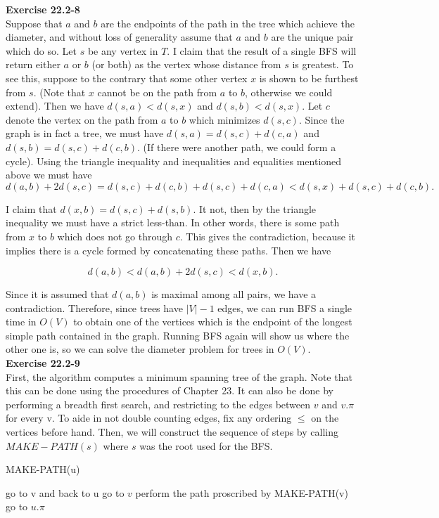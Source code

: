 \documentclass{article}
\begin{document}
\noindent\textbf{Exercise 22.2-8}\\

Suppose that $a$ and $b$ are the endpoints of the path in the tree which achieve the diameter, and without loss of generality assume that $a$ and $b$ are the unique pair which do so.  Let $s$ be any vertex in $T$.  I claim that the result of a single BFS will return either $a$ or $b$ (or both) as the vertex whose distance from $s$ is greatest.  To see this, suppose to the contrary that some other vertex $x$ is shown to be furthest from $s$. (Note that $x$ cannot be on the path from $a$ to $b$, otherwise we could extend).  Then we have $d(s,a) < d(s,x)$ and $d(s,b) < d(s,x)$.  Let $c$ denote the vertex on the path from $a$ to $b$ which minimizes $d(s,c)$.  Since the graph is in fact a tree, we must have $d(s,a) = d(s,c) + d(c,a)$ and $d(s,b) = d(s,c) + d(c,b)$.  (If there were another path, we could form a cycle).  Using the triangle inequality and inequalities and equalities mentioned above we must have
\[  d(a,b) + 2d(s,c) = d(s,c) + d(c,b) + d(s,c) + d(c,a) < d(s,x) + d(s,c) + d(c,b).\]

I claim that $d(x,b) = d(s,c) + d(s,b)$.  It not, then by the triangle inequality we must have a strict less-than.  In other words, there is some path from $x$ to $b$ which does not go through $c$.  This gives the contradiction, because it implies there is a cycle formed by concatenating these paths.  Then we have

\[ d(a,b) < d(a,b) + 2d(s,c) < d(x,b).\]

Since it is assumed that $d(a,b)$ is maximal among all pairs, we have a contradiction. Therefore, since trees have $|V| - 1$ edges, we can run BFS a single time in $O(V)$ to obtain one of the vertices which is the endpoint of the longest simple path contained in the graph. Running BFS again will show us where the other one is, so we can solve the diameter problem for trees in $O(V)$. \\


\noindent\textbf{Exercise 22.2-9}\\

First, the algorithm computes a minimum spanning tree of the graph. Note that this can be done using the procedures of Chapter 23. It can also be done by performing a breadth first search, and restricting to the edges between $v$ and $v.\pi$ for every v. To aide in not double counting edges, fix any ordering $\le$ on the vertices before hand. Then, we will construct the sequence of steps by calling $MAKE-PATH(s)$ where $s$ was the root used for the BFS. 
\begin{algorithm}
\caption{MAKE-PATH(u)}
\begin{algorithmic}
\State go to v and back to u
\EndFor
{}
\State go to $v$
\State perform the path proscribed by MAKE-PATH(v)
\EndFor
\State go to $u.\pi$
\end{algorithmic}
\end{algorithm}
\end{document}
